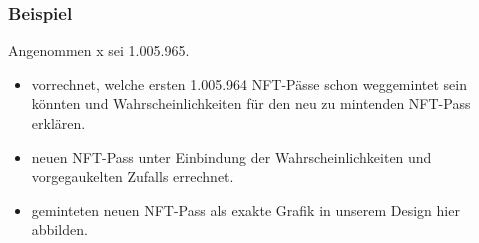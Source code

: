 
\subsubsection{Beispiel}

\vspace{0.2cm}


Angenommen x sei 1.005.965.

\begin{itemize}
  \item vorrechnet, welche ersten 1.005.964 NFT-Pässe schon weggemintet sein könnten und Wahrscheinlichkeiten für den neu zu mintenden NFT-Pass erklären.
  \item neuen NFT-Pass unter Einbindung der Wahrscheinlichkeiten und vorgegaukelten Zufalls errechnet.
  \item geminteten neuen NFT-Pass als exakte Grafik in unserem Design hier abbilden.
\end{itemize}

\vspace{0.3cm}